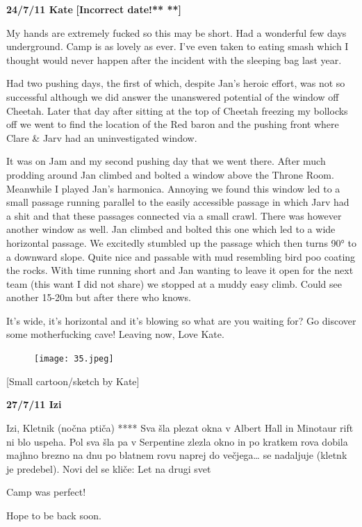 \textbf{24/7/11 Kate} \textbf{{[}Incorrect date!** **{]}}

My hands are extremely fucked so this may be short. Had a wonderful few
days underground. Camp is as lovely as ever. I've even taken to eating
smash which I thought would never happen after the incident with the
sleeping bag last year.

Had two pushing days, the first of which, despite Jan's heroic effort,
was not so successful although we did answer the unanswered potential of
the window off Cheetah. Later that day after sitting at the top of
Cheetah freezing my bollocks off we went to find the location of the Red
baron and the pushing front where Clare \& Jarv had an uninvestigated
window.

It was on Jam and my second pushing day that we went there. After much
prodding around Jan climbed and bolted a window above the Throne Room.
Meanwhile I played Jan's harmonica. Annoying we found this window led to
a small passage running parallel to the easily accessible passage in
which Jarv had a shit and that these passages connected via a small
crawl. There was however another window as well. Jan climbed and bolted
this one which led to a wide horizontal passage. We excitedly stumbled
up the passage which then turns 90° to a downward slope. Quite nice and
passable with mud resembling bird poo coating the rocks. With time
running short and Jan wanting to leave it open for the next team (this
want I did not share) we stopped at a muddy easy climb. Could see
another 15-20m but after there who knows.

It's wide, it's horizontal and it's blowing so what are you waiting for?
Go discover some motherfucking cave! Leaving now, Love Kate.

\begin{figure}[htbp]
\centering
\texttt{[image: 35.jpeg]}
\caption{}
\end{figure}

{[}Small cartoon/sketch by Kate{]}

\textbf{27/7/11 Izi}

Izi, Kletnik (nočna ptiča) **** Sva šla plezat okna v Albert Hall in
Minotaur rift ni blo uspeha. Pol sva šla pa v Serpentine zlezla okno in
po kratkem rova dobila majhno brezno na dnu po blatnem rovu naprej do
večjega\ldots{} se nadaljuje (kletnk je predebel). Novi del se kliče:
Let na drugi svet

Camp was perfect!

Hope to be back soon.

